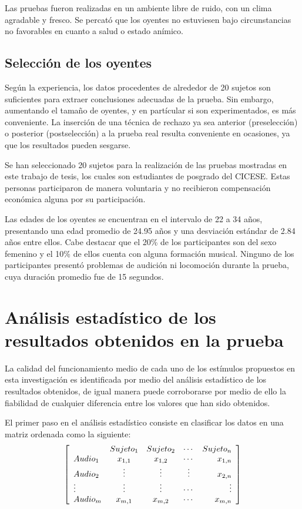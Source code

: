 Las pruebas fueron realizadas en un ambiente libre de ruido, con un clima agradable y fresco. Se percató que los oyentes no estuviesen bajo circunstancias no favorables en cuanto a salud o estado anímico. 

\subsection{Selección de los oyentes}
Según la experiencia, los datos procedentes de alrededor de 20 sujetos son suficientes para extraer conclusiones adecuadas de la prueba. Sin embargo, aumentando el tamaño de oyentes, y en partícular si son experimentados, es más conveniente. 
La inserción de una técnica de rechazo ya sea anterior (preselección) o posterior (postselección) a la prueba real resulta conveniente en ocasiones, ya que los resultados pueden sesgarse.  

Se han seleccionado 20 sujetos para la realización de las pruebas mostradas en este trabajo de tesis, los cuales son estudiantes de posgrado del CICESE. Estas personas participaron de manera voluntaria y no recibieron compensación económica alguna por su participación.

Las edades de los oyentes se encuentran en el intervalo de 22 a 34 años, presentando una edad promedio de 24.95 años y una desviación estándar de 2.84 años entre ellos. Cabe destacar que el 20\% de los participantes son del sexo femenino y el 10\% de ellos cuenta con alguna formación musical. Ninguno de los participantes presentó problemas de audición ni locomoción durante la prueba, cuya duración promedio fue de 15 segundos.

\section{Análisis estadístico de los resultados obtenidos en la prueba}
La calidad del funcionamiento medio de cada uno de los estímulos propuestos en esta investigación es identificada por medio del análisis estadístico de los resultados obtenidos, de igual manera puede corroborarse por medio de ello la fiabilidad de cualquier diferencia entre los valores que han sido obtenidos. 

El primer paso en el análisis estadístico consiste en clasificar los datos en una matriz ordenada como la siguiente:
\begin{equation}
\left[
\begin{array}{l c c c r}
		          & Sujeto_{1}	& Sujeto_{2} & \cdots & Sujeto_{n} \\
Audio_{1} 		& x_{1,1} 	& x_{1,2}      & \cdots & x_{1,n} \\
Audio_{2} 		& \vdots 	& \vdots & \vdots & x_{2,n} \\
\vdots 		& \vdots 	& \vdots & \cdots & \vdots \\
Audio_{m} 		& x_{m,1}	& x_{m,2} & \cdots & x_{m,n} \\
\end{array} \right] 
\end{equation}

